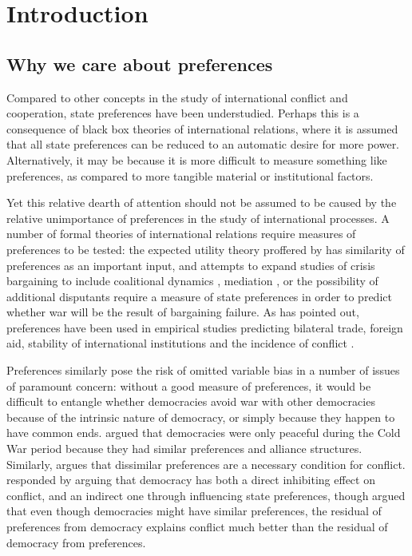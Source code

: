 \setcounter{section}{1}

\section{Introduction}

\subsection{Why we care about preferences}

Compared to other concepts in the study of international conflict and cooperation, state preferences have been understudied. Perhaps this is a consequence of black box theories of international relations, where it is assumed that all state preferences can be reduced to an automatic desire for more power. Alternatively, it may be because it is more difficult to measure something like preferences, as compared to more tangible material or institutional factors.

Yet this relative dearth of attention should not be assumed to be caused by the relative unimportance of preferences in the study of international processes. A number of formal theories of international relations require measures of preferences to be tested: the expected utility theory proffered by \citep{buenodemesquita:1983} has similarity of preferences as an important input, and attempts to expand studies of crisis bargaining to include coalitional dynamics \citep{wolford:2014}, mediation \citep{kydd:2006}, or the possibility of additional disputants \citep{gallop:2017} require a measure of state preferences in order to predict whether war will be the result of bargaining failure. As \citet{hage:2011} has pointed out, preferences have been used in empirical studies predicting bilateral trade, foreign aid, stability of international institutions and the incidence of conflict \citep{kastner:2007, derouen:heo:2004, stone:2004, gartzke:2007, braumoeller:2008}. 

Preferences similarly pose the risk of omitted variable bias in a number of issues of paramount concern: without a good measure of preferences, it would be difficult to entangle whether democracies avoid war with other democracies because of the intrinsic nature of democracy, or simply because they happen to have common ends. \citet{gowa:farber:year} argued that democracies were only peaceful during the Cold War period because they had similar preferences and alliance structures. Similarly, \citet{gartzke:year} argues that dissimilar preferences are a necessary condition for conflict. \citet{oneal:russett:1998} responded by arguing that democracy has both a direct inhibiting effect on conflict, and an indirect one through influencing state preferences, though \citet{gartzke:year} argued that even though democracies might have similar preferences, the residual of preferences from democracy explains conflict much better than the residual of democracy from preferences. 

